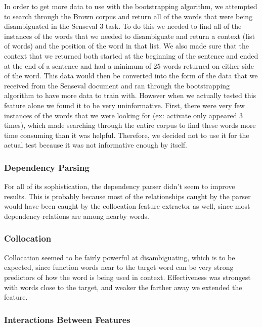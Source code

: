 \documentclass{article}
\begin{document}
In order to get more data to use with the bootstrapping algorithm, we attempted
to search through the Brown corpus and return all of the words that were being
disambiguated in the Senseval 3 task.  To do this we needed to find all of the
instances of the words that we needed to disambiguate and return a context
(list of words) and the position of the word in that list.  We also made sure
that the context that we returned both started at the beginning of the
sentence and ended at the end of a sentence and had a minimum of 25 words
returned on either side of the word.  This data would then be converted into
the form of the data that we received from the Senseval document and ran
through the bootstrapping algorithm to have more data to train with.  However
when we actually tested this feature alone we found it to be very
uninformative.  First, there were very few instances of the words that we were
looking for (ex: activate only appeared 3 times), which made searching through
the entire corpus to find these words more time consuming than it was helpful.
Therefore, we decided not to use it for the actual test because it was not
informative enough by itself.


\subsubsection{Dependency Parsing}

For all of its sophistication, the dependency parser didn't seem to improve
results.  This is probably because most of the relationships caught by the
parser would have been caught by the collocation feature extractor as well,
since most dependency relations are among nearby words.

\subsubsection{Collocation}

Collocation seemed to be fairly powerful at disambiguating, which is to be
expected, since function words near to the target word can be very strong
predictors of how the word is being used in context.  Effectiveness was
strongest with words close to the target, and weaker the farther away we
extended the feature.

\subsubsection{Interactions Between Features}
\end{document}
